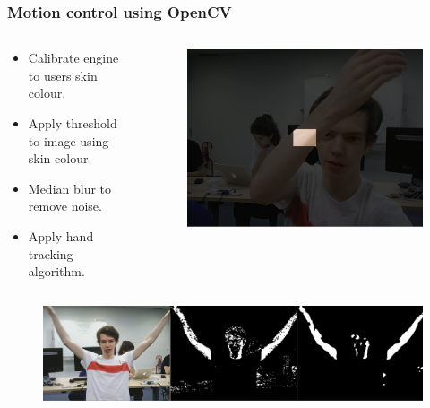 \documentclass{beamer}
\begin{document}
\begin{frame}
	\frametitle{Motion control using OpenCV}
	\begin{columns}
		\begin{column}{0.6\textwidth}
			\begin{itemize}
				\item Calibrate engine to users skin colour.
				\item Apply threshold to image using skin colour.
				\item Median blur to remove noise.
				\item Apply hand tracking algorithm.
			\end{itemize}
		\end{column}
		\begin{column}{0.4\textwidth}
			\begin{figure}
				\includegraphics[width=\columnwidth-2\columnsep]{Presentation/calibration.png}
			\end{figure}
		\end{column}
	\end{columns}
	\begin{figure}
		\includegraphics[width=\textwidth]{Presentation/opencv.png}
	\end{figure}
\end{frame}
\end{document}

